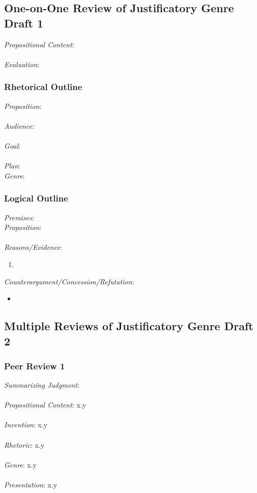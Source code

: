 \documentclass[12pt]{article}
\begin{document}
\subsection{One-on-One Review of Justificatory Genre Draft 1}
\noindent \textit{Propositional Content}: \\ \\
\textit{Evaluation}: 
\subsubsection*{Rhetorical Outline}
\noindent\textit{Proposition}: \\ \\
\textit{Audience}: \\ \\
\textit{Goal}: \\ \\
\textit{Plan}: \\
\textit{Genre}: 

\subsubsection*{Logical Outline}
\noindent\textit{Premises}: \\
\textit{Proposition}: \\ \\
\textit{Reasons/Evidence}:
\begin{enumerate}
	\item 
\end{enumerate}
\textit{Counterargument/Concession/Refutation}:
\begin{itemize}
	\item 
\end{itemize}


\newpage
\subsection{Multiple Reviews of Justificatory Genre Draft 2}
\subsubsection*{Peer Review 1} 
\noindent \textit{Summarizing Judgment}: \\ \\
\textit{Propositional Content}: x.y \\ \\ %
\textit{Invention}: x.y \\ \\
\textit{Rhetoric}: x.y \\ \\
\textit{Genre}: x.y \\ \\
\textit{Presentation}: x.y
\end{document}
